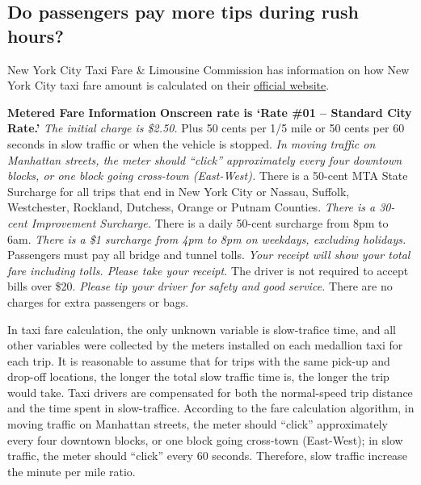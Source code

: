 \documentclass[12pt,twoside]{reedthesis}
\theoremstyle{definition}
\theoremstyle{definition}
\theoremstyle{definition}
\theoremstyle{remark}
\begin{document}
\subsection{Do passengers pay more tips during rush
hours?}\label{do-passengers-pay-more-tips-during-rush-hours}

New York City Taxi Fare \& Limousine Commission has information on how
New York City taxi fare amount is calculated on their
\href{http://www.nyc.gov/html/tlc/html/passenger/taxicab_rate.shtml}{official
website}.

\textbf{Metered Fare Information} \textbf{Onscreen rate is `Rate \#01 --
Standard City Rate.'} \emph{The initial charge is \$2.50. }Plus 50 cents
per 1/5 mile or 50 cents per 60 seconds in slow traffic or when the
vehicle is stopped. \emph{In moving traffic on Manhattan streets, the
meter should ``click'' approximately every four downtown blocks, or one
block going cross-town (East-West). }There is a 50-cent MTA State
Surcharge for all trips that end in New York City or Nassau, Suffolk,
Westchester, Rockland, Dutchess, Orange or Putnam Counties. \emph{There
is a 30-cent Improvement Surcharge. }There is a daily 50-cent surcharge
from 8pm to 6am. \emph{There is a \$1 surcharge from 4pm to 8pm on
weekdays, excluding holidays. }Passengers must pay all bridge and tunnel
tolls. \emph{Your receipt will show your total fare including tolls.
Please take your receipt. }The driver is not required to accept bills
over \$20. \emph{Please tip your driver for safety and good service.
}There are no charges for extra passengers or bags.

In taxi fare calculation, the only unknown variable is slow-trafice
time, and all other variables were collected by the meters installed on
each medallion taxi for each trip. It is reasonable to assume that for
trips with the same pick-up and drop-off locations, the longer the total
slow traffic time is, the longer the trip would take. Taxi drivers are
compensated for both the normal-speed trip distance and the time spent
in slow-traffice. According to the fare calculation algorithm, in moving
traffic on Manhattan streets, the meter should ``click'' approximately
every four downtown blocks, or one block going cross-town (East-West);
in slow traffic, the meter should ``click'' every 60 seconds. Therefore,
slow traffic increase the minute per mile ratio.
\end{document}
